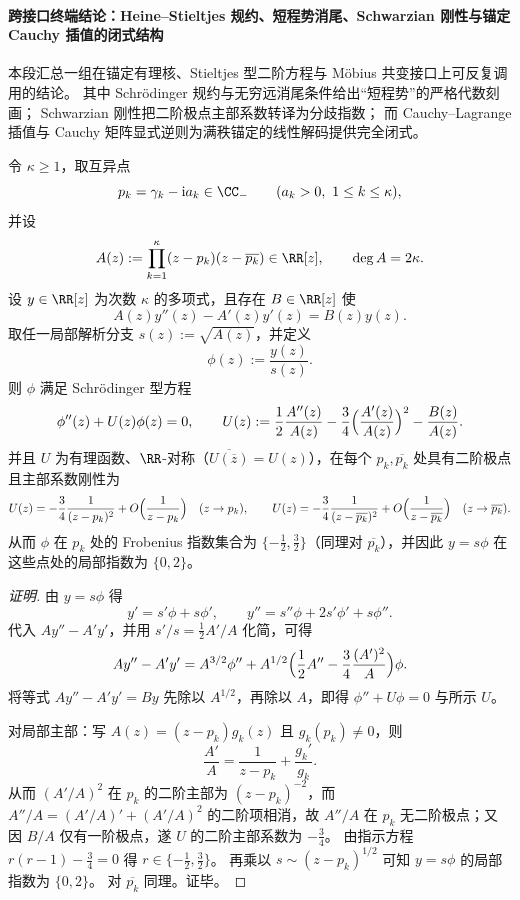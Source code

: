 
\paragraph{跨接口终端结论：Heine--Stieltjes 规约、短程势消尾、Schwarzian 刚性与锚定 Cauchy 插值的闭式结构}
本段汇总一组在锚定有理核、Stieltjes 型二阶方程与 Möbius 共变接口上可反复调用的结论。
其中 Schrödinger 规约与无穷远消尾条件给出“短程势”的严格代数刻画；
Schwarzian 刚性把二阶极点主部系数转译为分歧指数；
而 Cauchy--Lagrange 插值与 Cauchy 矩阵显式逆则为满秩锚定的线性解码提供完全闭式。

\begin{conclusion}\label{con:xi-terminal-heine-stieltjes-schrodinger-reduction-local-exponent-rigidity}
令 \(\kappa\ge 1\)，取互异点
\[
p_k=\gamma_k-\mathrm{i}a_k\in\CC_{-}\qquad(a_k>0,\ 1\le k\le \kappa),
\]
并设
\[
A(z):=\prod_{k=1}^{\kappa}(z-p_k)(z-\overline{p_k})\in\RR[z],
\qquad
\deg A=2\kappa.
\]
设 \(y\in\RR[z]\) 为次数 \(\kappa\) 的多项式，且存在 \(B\in\RR[z]\) 使
\[
A(z)y''(z)-A'(z)y'(z)=B(z)y(z).
\]
取任一局部解析分支 \(s(z):=\sqrt{A(z)}\)，并定义
\[
\phi(z):=\frac{y(z)}{s(z)}.
\]
则 \(\phi\) 满足 Schr\"odinger 型方程
\[
\phi''(z)+U(z)\phi(z)=0,
\qquad
U(z):=\frac{1}{2}\frac{A''(z)}{A(z)}-\frac{3}{4}\Bigl(\frac{A'(z)}{A(z)}\Bigr)^2-\frac{B(z)}{A(z)}.
\]
并且 \(U\) 为有理函数、\(\RR\)-对称（\(\overline{U(\overline z)}=U(z)\)），在每个 \(p_k,\overline{p_k}\) 处具有二阶极点且主部系数刚性为
\[
U(z)=-\frac{3}{4}\frac{1}{(z-p_k)^2}+O\Bigl(\frac{1}{z-p_k}\Bigr)\quad(z\to p_k),
\qquad
U(z)=-\frac{3}{4}\frac{1}{(z-\overline{p_k})^2}+O\Bigl(\frac{1}{z-\overline{p_k}}\Bigr)\quad(z\to\overline{p_k}).
\]
从而 \(\phi\) 在 \(p_k\) 处的 Frobenius 指数集合为 \(\{-\tfrac12,\tfrac32\}\)（同理对 \(\overline{p_k}\)），并因此 \(y=s\phi\) 在这些点处的局部指数为 \(\{0,2\}\)。
\end{conclusion}
\begin{proof}[证明]
由 \(y=s\phi\) 得
\[
y'=s'\phi+s\phi',\qquad
y''=s''\phi+2s'\phi'+s\phi''.
\]
代入 \(Ay''-A'y'\)，并用 \(s'/s=\tfrac12 A'/A\) 化简，可得
\[
Ay''-A'y'
=A^{3/2}\phi''+A^{1/2}\Bigl(\frac12A''-\frac34\frac{(A')^2}{A}\Bigr)\phi.
\]
将等式 \(Ay''-A'y'=By\) 先除以 \(A^{1/2}\)，再除以 \(A\)，即得 \(\phi''+U\phi=0\) 与所示 \(U\)。
\par
对局部主部：写 \(A(z)=(z-p_k)g_k(z)\) 且 \(g_k(p_k)\neq 0\)，则
\[
\frac{A'}{A}=\frac{1}{z-p_k}+\frac{g_k'}{g_k}.
\]
从而 \((A'/A)^2\) 在 \(p_k\) 的二阶主部为 \((z-p_k)^{-2}\)，而
\(
A''/A=(A'/A)'+(A'/A)^2
\)
的二阶项相消，故 \(A''/A\) 在 \(p_k\) 无二阶极点；又因 \(B/A\) 仅有一阶极点，遂 \(U\) 的二阶主部系数为 \(-\tfrac34\)。
由指示方程 \(r(r-1)-\tfrac34=0\) 得 \(r\in\{-\tfrac12,\tfrac32\}\)。
再乘以 \(s\sim (z-p_k)^{1/2}\) 可知 \(y=s\phi\) 的局部指数为 \(\{0,2\}\)。
对 \(\overline{p_k}\) 同理。证毕。
\end{proof}

